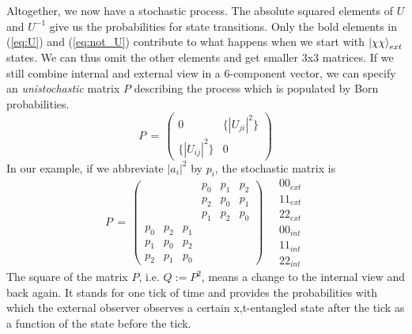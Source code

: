 \documentclass[12pt]{article}
\begin{document}
Altogether, we now have a stochastic process. The absolute squared elements of $U$ and $U^{-1}$ give us the probabilities for state transitions. Only the bold elements in (\ref{eq:U}) and (\ref{eq:not_U}) contribute to what happens when we start with $\ket{\chi\chi}_{ext}$ states. We can thus omit the other elements and get smaller 3x3 matrices. If we still combine internal and external view in a 6-component vector, we can specify an \emph{unistochastic} matrix $P$ describing the process which is populated by Born probabilities.
\begin{equation}
P\, =\,
\begin{pmatrix}
0 & \{|U_{ji}|^2\} \\
\{|U_{ij}|^2\} & 0
\end{pmatrix}
\end{equation}
In our example, if we abbreviate $|a_i|^2$ by $p_i$, the stochastic matrix is
\begin{equation}
P\, =\,
\begin{pmatrix}
&&& p_0 & p_1 & p_2 \\
&&& p_2 & p_0 & p_1 \\
&&& p_1 & p_2 & p_0 \\
p_0 & p_2 & p_1 &&& \\
p_1 & p_0 & p_2 &&& \\
p_2 & p_1 & p_0 &&& 
\end{pmatrix}
\quad
\begin{matrix}
00_{ext} \\ 11_{ext} \\ 22_{ext} \\ 00_{int} \\ 11_{int} \\ 22_{int}
\end{matrix}
\end{equation}
The square of the matrix $P$, i.e. $Q:=P^2$, means a change to the internal view and back again. It stands for one tick of time and provides the probabilities with which the external observer observes a certain x,t-entangled state after the tick as a function of the state before the tick.
\end{document}
